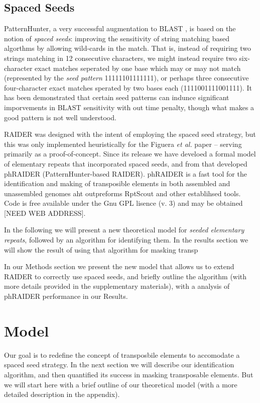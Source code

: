 \documentclass{bmcart}
\begin{document}
\subsection*{Spaced Seeds}
 
PatternHunter, a very successful augmentation to BLAST
\cite{Li:2004wl,Altschul:1997p843}, is based on the notion of {\it
  spaced seeds}: improving the sensitivity of string matching based
algorthms by allowing wild-cards in the match.  That is, instead of
requiring two strings matching in 12 consecutive characters, we might
instead require two six-character exact matches seperated by one base
which may or may not match (represented by the {\it seed pattern}
11111101111111), or perhaps three consecutive four-character exact
matches sperated by two bases each (1111001111001111). It has been
demonstrated that certain seed patterns can indunce significant
imporvements in BLAST sensitivity with out time penalty, though what
makes a good pattern is not well understood.


RAIDER was designed with the intent of employing the spaced seed
strategy, but this was only implemented heuristically for the Figuera
{\it et al.} paper \cite{Figueroa:2013cz} -- serving primarily as a
proof-of-concept.  Since its release we have develoed a formal model
of elementary repeats that incorporated spaced seeds, and from that
developed phRAIDER (PatternHunter-based RAIDER).  phRAIDER is a fast
tool for the identification and making of transposible elements in
both assembled and unassembled genomes aht outpreforms RptScout and
other establihsed tools. Code is free available under the Gnu GPL
lisence (v. 3) and  may be obtained [NEED WEB ADDRESS].  


In the following we will present a new theoretical model for {\it
  seeded elementary repeats}, followed by an algorithm for identifying
them.  In the results section we will show the result of using that
algorithm for masking transp

In our Methods section
we present the new model that allows us to extend RAIDER to correctly
use spaced seeds, and briefly outline the algorithm (with more details
provided in the supplementary materials), with a analysis of phRAIDER
performance in our Results.


\section*{Model}

Our goal is to redefine the concept of transposbile elements to
accomodate a spaced seed strategy.  In the next section we will describe our
identification algorithm, and then quantified its success in 
masking transposable elements. But we will start here with a brief
outline of our theoretical model (with a more detailed description in
the appendix).
\end{document}
